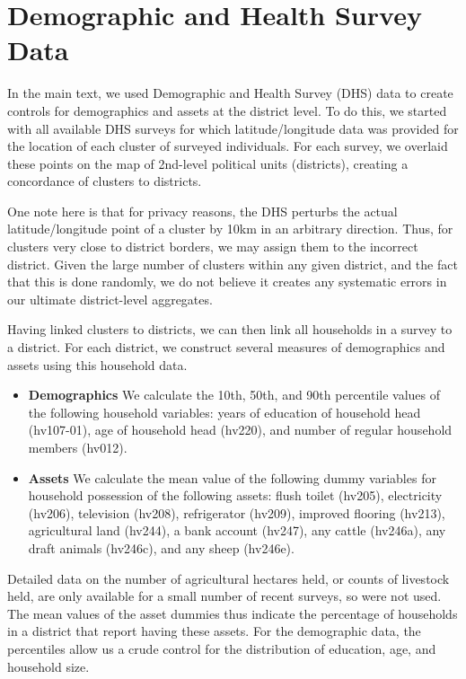 \documentclass[11pt]{article}
\begin{document}
\section{Demographic and Health Survey Data}
In the main text, we used Demographic and Health Survey (DHS) data to create controls for demographics and assets at the district level. To do this, we started with all available DHS surveys for which latitude/longitude data was provided for the location of each cluster of surveyed individuals. For each survey, we overlaid these points on the map of 2nd-level political units (districts), creating a concordance of clusters to districts. 

One note here is that for privacy reasons, the DHS perturbs the actual latitude/longitude point of a cluster by 10km in an arbitrary direction. Thus, for clusters very close to district borders, we may assign them to the incorrect district. Given the large number of clusters within any given district, and the fact that this is done randomly, we do not believe it creates any systematic errors in our ultimate district-level aggregates. 

Having linked clusters to districts, we can then link all households in a survey to a district. For each district, we construct several measures of demographics and assets using this household data. 
\begin{itemize}
    \item \textbf{Demographics} We calculate the 10th, 50th, and 90th percentile values of the following household variables: years of education of household head (hv107-01), age of household head (hv220), and number of regular household members (hv012).
    \item \textbf{Assets} We calculate the mean value of the following dummy variables for household possession of the following assets: flush toilet (hv205), electricity (hv206), television (hv208), refrigerator (hv209), improved flooring (hv213), agricultural land (hv244), a bank account (hv247), any cattle (hv246a), any draft animals (hv246c), and any sheep (hv246e). 
\end{itemize}

Detailed data on the number of agricultural hectares held, or counts of livestock held, are only available for a small number of recent surveys, so were not used. The mean values of the asset dummies thus indicate the percentage of households in a district that report having these assets. For the demographic data, the percentiles allow us a crude control for the distribution of education, age, and household size.
\end{document}
